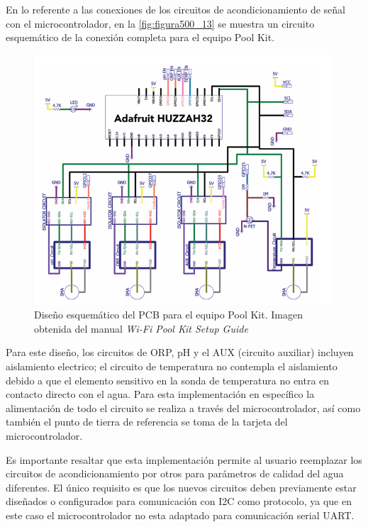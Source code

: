 En lo referente a las conexiones de los circuitos de acondicionamiento de señal con el microcontrolador, en la \autoref{fig:figura500_13} se muestra un circuito esquemático de la conexión completa para el equipo Pool Kit.

\clearpage

\begin{figure}[h]
	\centering
	\includegraphics[scale=0.7]{imgss213.png}
	\caption{Diseño esquemático del PCB para el equipo Pool Kit. Imagen obtenida del manual \textit{Wi-Fi Pool Kit Setup Guide}}
	\label{fig:figura500_13}
\end{figure}

Para este diseño, los circuitos de ORP, pH y el AUX (circuito auxiliar) incluyen aislamiento electrico; el circuito de temperatura no contempla el aislamiento debido a que el elemento sensitivo en la sonda de temperatura 
no entra en contacto directo con el agua. Para esta implementación en específico la alimentación de todo el circuito se realiza a través del microcontrolador, así como también el punto de tierra de referencia se toma de 
la tarjeta del microcontrolador.

Es importante resaltar que esta implementación permite al usuario reemplazar los circuitos de acondicionamiento por otros para parámetros de calidad del agua diferentes. El único requisito es que los nuevos circuitos deben 
previamente estar diseñados o configurados para comunicación con I2C como protocolo, ya que en este caso el microcontrolador no esta adaptado para comunicación serial UART.

